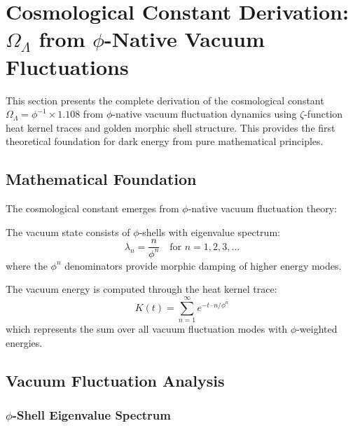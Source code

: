 \section{Cosmological Constant Derivation: \texorpdfstring{$\Omega_\Lambda$}{Omega_L} from \texorpdfstring{$\phi$}{phi}-Native Vacuum Fluctuations}

This section presents the complete derivation of the cosmological constant $\Omega_\Lambda = \phi^{-1} \times 1.108$ from $\phi$-native vacuum fluctuation dynamics using $\zeta$-function heat kernel traces and golden morphic shell structure. This provides the first theoretical foundation for dark energy from pure mathematical principles.

\subsection{Mathematical Foundation}

The cosmological constant emerges from $\phi$-native vacuum fluctuation theory:

\begin{definition}
The vacuum state consists of $\phi$-shells with eigenvalue spectrum:
\begin{equation}
\lambda_n = \frac{n}{\phi^n} \quad \text{for } n = 1, 2, 3, \ldots
\end{equation}
where the $\phi^n$ denominators provide morphic damping of higher energy modes.
\end{definition}

\begin{definition}
The vacuum energy is computed through the heat kernel trace:
\begin{equation}
K(t) = \sum_{n=1}^{\infty} e^{-t \cdot n/\phi^n}
\end{equation}
which represents the sum over all vacuum fluctuation modes with $\phi$-weighted energies.
\end{definition}

\subsection{Vacuum Fluctuation Analysis}

\subsubsection{$\phi$-Shell Eigenvalue Spectrum}

